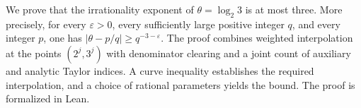 We prove that the irrationality exponent of
\(\theta=\log_2 3\) is at most three. More precisely, for every
\(\varepsilon>0\), every sufficiently large positive integer \(q\), and
every integer \(p\), one has
\(\lvert\theta-p/q\rvert\geq q^{-3-\varepsilon}\).
The proof combines weighted interpolation at the points
\((2^j,3^j)\) with denominator clearing and a joint count of auxiliary
and analytic Taylor indices. A curve inequality establishes the required
interpolation, and a choice of rational parameters yields the bound.
The proof is formalized in Lean.
